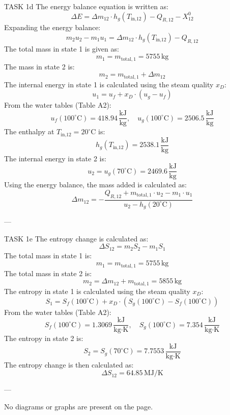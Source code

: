 TASK 1d  
The energy balance equation is written as:  
\[
\Delta E = \Delta m_{12} \cdot h_g(T_{\text{in,12}}) - Q_{R,12} - X_{12}^0
\]  
Expanding the energy balance:  
\[
m_2 u_2 - m_1 u_1 = \Delta m_{12} \cdot h_g(T_{\text{in,12}}) - Q_{R,12}
\]  
The total mass in state 1 is given as:  
\[
m_1 = m_{\text{total},1} = 5755 \, \text{kg}
\]  
The mass in state 2 is:  
\[
m_2 = m_{\text{total},1} + \Delta m_{12}
\]  
The internal energy in state 1 is calculated using the steam quality \( x_D \):  
\[
u_1 = u_f + x_D \cdot (u_g - u_f)
\]  
From the water tables (Table A2):  
\[
u_f(100^\circ\text{C}) = 418.94 \, \frac{\text{kJ}}{\text{kg}}, \quad u_g(100^\circ\text{C}) = 2506.5 \, \frac{\text{kJ}}{\text{kg}}
\]  
The enthalpy at \( T_{\text{in,12}} = 20^\circ\text{C} \) is:  
\[
h_g(T_{\text{in,12}}) = 2538.1 \, \frac{\text{kJ}}{\text{kg}}
\]  
The internal energy in state 2 is:  
\[
u_2 = u_g(70^\circ\text{C}) = 2469.6 \, \frac{\text{kJ}}{\text{kg}}
\]  
Using the energy balance, the mass added is calculated as:  
\[
\Delta m_{12} = -\frac{Q_{R,12} + m_{\text{total},1} \cdot u_2 - m_1 \cdot u_1}{u_2 - h_g(20^\circ\text{C})}
\]  

---

TASK 1e  
The entropy change is calculated as:  
\[
\Delta S_{12} = m_2 S_2 - m_1 S_1
\]  
The total mass in state 1 is:  
\[
m_1 = m_{\text{total},1} = 5755 \, \text{kg}
\]  
The total mass in state 2 is:  
\[
m_2 = \Delta m_{12} + m_{\text{total},1} = 5855 \, \text{kg}
\]  
The entropy in state 1 is calculated using the steam quality \( x_D \):  
\[
S_1 = S_f(100^\circ\text{C}) + x_D \cdot (S_g(100^\circ\text{C}) - S_f(100^\circ\text{C}))
\]  
From the water tables (Table A2):  
\[
S_f(100^\circ\text{C}) = 1.3069 \, \frac{\text{kJ}}{\text{kg·K}}, \quad S_g(100^\circ\text{C}) = 7.354 \, \frac{\text{kJ}}{\text{kg·K}}
\]  
The entropy in state 2 is:  
\[
S_2 = S_g(70^\circ\text{C}) = 7.7553 \, \frac{\text{kJ}}{\text{kg·K}}
\]  
The entropy change is then calculated as:  
\[
\Delta S_{12} = 64.85 \, \text{MJ/K}
\]  

---

No diagrams or graphs are present on the page.